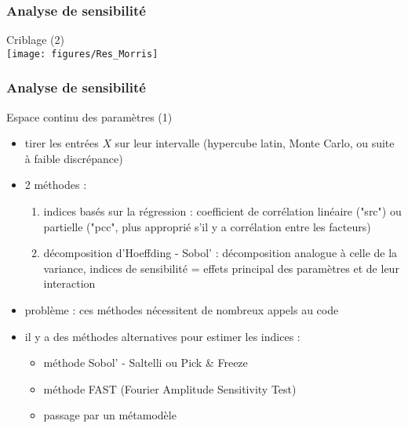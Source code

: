 \documentclass[10pt]{beamer}
\begin{document}
\begin{frame}
\frametitle{Analyse de sensibilité}

\bigskip
\bigskip

Criblage (2)
\bigskip
\\

\centering
\texttt{[image: figures/Res\_Morris]}

\end{frame}

\begin{frame}
\frametitle{Analyse de sensibilité}

\bigskip
\bigskip

Espace continu des paramètres (1)


\begin{itemize}
	\item tirer les entrées $ X $ sur leur intervalle (hypercube latin, Monte Carlo, ou suite à faible discrépance)
	\item 2 méthodes :
	\begin{enumerate}	
		\item indices basés sur la régression : coefficient de corrélation linéaire ("src") ou partielle ("pcc", plus approprié s'il y a corrélation entre les facteurs)
		\item décomposition d'Hoeffding - Sobol' : décomposition analogue à celle de la variance, indices de sensibilité = effets principal des paramètres et de leur interaction
	\end{enumerate}
\end{itemize}
\begin{itemize}
	\item problème : ces méthodes nécessitent de nombreux appels au code
	\item il y a des méthodes alternatives pour estimer les indices :
	\begin{itemize}
		\item méthode Sobol' - Saltelli ou Pick \& Freeze
		\item méthode FAST (Fourier Amplitude Sensitivity Test)
		\item passage par un métamodèle
	\end{itemize}
\end{itemize}

\end{frame}
\end{document}
